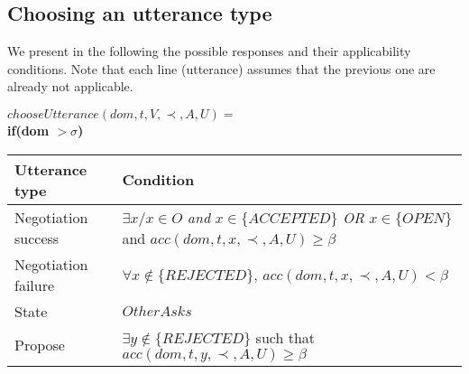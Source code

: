 \documentclass{article}
\begin{document}
	\subsection{Choosing an utterance type}
		
		We present in the following the possible responses and their applicability conditions. Note that each line (utterance)  assumes that the previous one are already not applicable.
	
	$ chooseUtterance(dom, t, V, \prec, A, U) = $ \\
	\textbf{if(\textbf{dom  $>\sigma$})} \\
	\begin{tabular}{|p{3cm}|p{9cm}|}
		\hline
		\textbf{Utterance type} & Condition \\
		\hline
	 Negotiation success &  $\exists x/ x \in O$  \emph{and} $x \in \{ACCEPTED\}$  \newline \emph{OR} \newline $x \in \{OPEN\}$ and \newline $acc(dom,t,x,\prec,A,U) \geq \beta$ \\
		\hline
		Negotiation failure & $ \forall x \notin \{REJECTED\}$, \newline  $acc(dom,t,x,\prec,A,U) < \beta $ \\
		\hline
		State & $OtherAsks$ \\
		\hline
		Propose & $\exists y \notin \{REJECTED\}$ such that \newline $acc(dom,t,y,\prec,A,U) \geq \beta $  \\
		
	\hline
	\end{tabular}
	\\ \\
		
\end{document}
